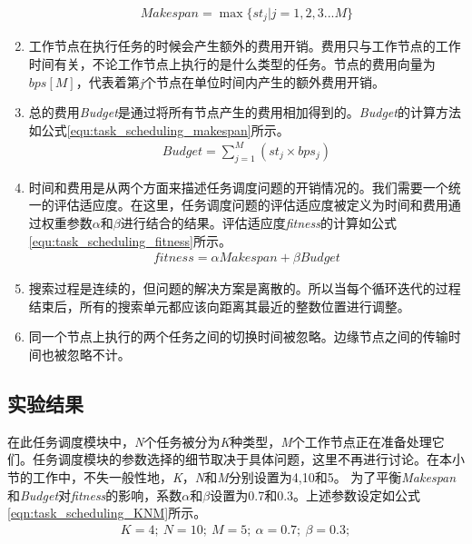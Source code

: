 \begin{enumerate}[]
    \begin{eqnarray}\label{equ:task_scheduling_makespan}
        Makespan=\max\{st_j | j=1,2,3...M\}
    \end{eqnarray}
    \item 工作节点在执行任务的时候会产生额外的费用开销。费用只与工作节点的工作时间有关，不论工作节点上执行的是什么类型的任务。节点的费用向量为$bps[M]$，代表着第\emph{j}个节点在单位时间内产生的额外费用开销。
    \item  总的费用\emph{Budget}是通过将所有节点产生的费用相加得到的。\emph{Budget}的计算方法如公式\ref{equ:task_scheduling_makespan}所示。
    \begin{eqnarray}\label{equ:task_scheduling_budget}
        Budget=\sum_{j=1}^{M} (st_j \times bps_j)
    \end{eqnarray}
    \item 时间和费用是从两个方面来描述任务调度问题的开销情况的。我们需要一个统一的评估适应度。在这里，任务调度问题的评估适应度被定义为时间和费用通过权重参数$\alpha$和$\beta$进行结合的结果。评估适应度\emph{fitness}的计算如公式\ref{equ:task_scheduling_fitness}所示。
    \begin{eqnarray}\label{equ:task_scheduling_fitness}
        fitness=\alpha Makespan + \beta Budget
    \end{eqnarray}
    \item 搜索过程是连续的，但问题的解决方案是离散的。所以当每个循环迭代的过程结束后，所有的搜索单元都应该向距离其最近的整数位置进行调整。
    \item 同一个节点上执行的两个任务之间的切换时间被忽略。边缘节点之间的传输时间也被忽略不计。
\end{enumerate}
\subsection{实验结果}
在此任务调度模块中，\emph{N}个任务被分为\emph{K}种类型，\emph{M}个工作节点正在准备处理它们。任务调度模块的参数选择的细节取决于具体问题，这里不再进行讨论。在本小节的工作中，不失一般性地，\emph{K}，\emph{N}和\emph{M}分别设置为4,10和5。 为了平衡\emph{Makespan}和\emph{Budget}对\emph{fitness}的影响，系数$\alpha$和$\beta$设置为0.7和0.3。上述参数设定如公式\ref{eqn:task_scheduling_KNM}所示。
\begin{eqnarray}\label{eqn:task_scheduling_KNM}
    K=4;\ N=10;\ M=5;\ \alpha=0.7;\ \beta=0.3; 
\end{eqnarray}

